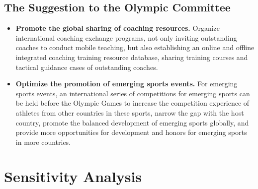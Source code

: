 \documentclass{mcmthesis}  %
\begin{document}
\subsection{The Suggestion to the Olympic Committee}
\begin{itemize}  %
\item \textbf{Promote the global sharing of coaching resources.} Organize international coaching exchange programs, not only inviting outstanding coaches to conduct mobile teaching, but also establishing an online and offline integrated coaching training resource database, sharing training courses and tactical guidance cases of outstanding coaches.
\item \textbf{Optimize the promotion of emerging sports events.} For emerging sports events, an international series of competitions for emerging sports can be held before the Olympic Games to increase the competition experience of athletes from other countries in these sports, narrow the gap with the host country, promote the balanced development of emerging sports globally, and provide more opportunities for development and honors for emerging sports in more countries.
\end{itemize}  %

\section{Sensitivity Analysis}  %
\end{document}
